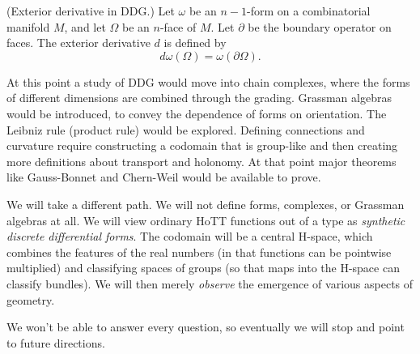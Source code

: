 \begin{mydef}
(Exterior derivative in DDG.) Let \( \omega \) be an \( n-1 \)-form on a combinatorial manifold \( M \), and let \( \Omega \) be an \( n \)-face of \( M \). Let \( \partial \) be the boundary operator on faces. The exterior derivative \( d \) is defined by 
\[ 
 d\omega(\Omega) = \omega(\partial\Omega).
\]
\end{mydef}

At this point a study of DDG would move into chain complexes, where the forms of different dimensions are combined through the grading. Grassman algebras would be introduced, to convey the dependence of forms on orientation. The Leibniz rule (product rule) would be explored. Defining connections and curvature require constructing a codomain that is group-like and then creating more definitions about transport and holonomy. At that point major theorems like Gauss-Bonnet and Chern-Weil would be available to prove.

We will take a different path. We will not define forms, complexes, or Grassman algebras at all. We will view ordinary HoTT functions out of a type as \emph{synthetic discrete differential forms}. The codomain will be a central H-space, which combines the features of the real numbers (in that functions can be pointwise multiplied) and classifying spaces of groups (so that maps into the H-space can classify bundles). We will then merely \emph{observe} the emergence of various aspects of geometry.

We won't be able to answer every question, so eventually we will stop and point to future directions.
